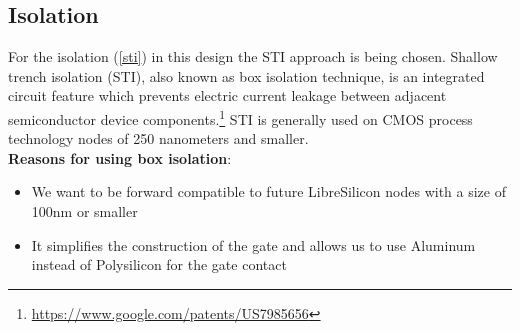 \subsection{Isolation}
For the isolation (\autoref{sti})  in this design the STI approach is being chosen.
Shallow trench isolation (STI), also known as box isolation technique, is an integrated circuit feature which prevents electric current leakage between adjacent semiconductor device components.\footnote{\url{https://www.google.com/patents/US7985656}}
STI is generally used on CMOS process technology nodes of 250 nanometers and smaller.\\

\textbf{Reasons for using box isolation}:\begin{itemize}
\item We want to be forward compatible to future LibreSilicon nodes with a size of 100nm or smaller
\item It simplifies the construction of the gate and allows us to use Aluminum instead of Polysilicon for the gate contact
\end{itemize}
